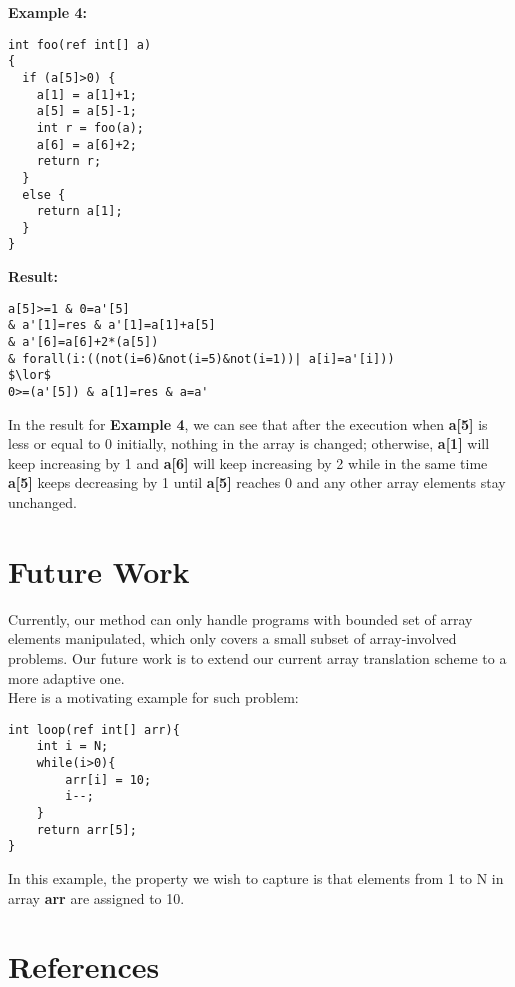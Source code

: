 \documentclass[]{article}
\begin{document}
\textbf{Example 4:}
\begin{lstlisting}[frame=single]
int foo(ref int[] a)
{
  if (a[5]>0) {
    a[1] = a[1]+1;
    a[5] = a[5]-1;
    int r = foo(a);
    a[6] = a[6]+2;
    return r;
  }
  else {
    return a[1];
  }
}
\end{lstlisting}
\textbf{Result:}
\begin{lstlisting}[mathescape]
a[5]>=1 & 0=a'[5]
& a'[1]=res & a'[1]=a[1]+a[5]
& a'[6]=a[6]+2*(a[5]) 
& forall(i:((not(i=6)&not(i=5)&not(i=1))| a[i]=a'[i]))
$\lor$
0>=(a'[5]) & a[1]=res & a=a'
\end{lstlisting}
In the result for \textbf{Example 4}, we can see that after the execution when \textbf{a[5]} is less or equal to 0 initially, nothing in the array is changed; otherwise, \textbf{a[1]} will keep increasing by 1 and \textbf{a[6]} will keep increasing by 2 while in the same time \textbf{a[5]} keeps decreasing by 1 until \textbf{a[5]} reaches 0 and any other array elements stay unchanged.

\section{Future Work}
Currently, our method can only handle programs with bounded set of array elements manipulated, which only covers a small subset of array-involved problems. Our future work is to extend our current array translation scheme to a more adaptive one.\\
Here is a motivating example for such problem:
\begin{lstlisting}
int loop(ref int[] arr){
	int i = N;
	while(i>0){
		arr[i] = 10;
		i--;
	}
	return arr[5];
}
\end{lstlisting}
In this example, the property we wish to capture is that elements from 1 to N in array \textbf{arr} are assigned to 10.

\section{References}
\end{document}
